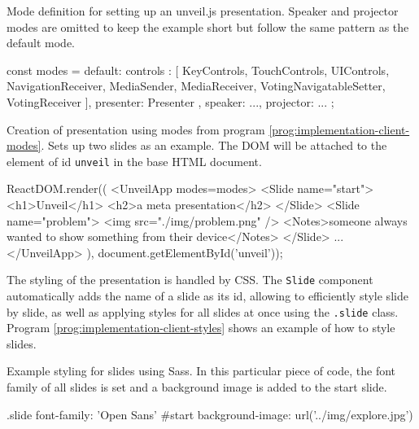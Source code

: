 \begin{program}
\caption{Mode definition for setting up an unveil.js presentation. Speaker and projector modes are omitted to keep the example short but follow the same pattern as the default mode.}
\label{prog:implementation-client-modes}
\begin{JsCode}
const modes = {
  default: {
    controls : [
      KeyControls, TouchControls, UIControls,
      NavigationReceiver,
      MediaSender, MediaReceiver,
      VotingNavigatableSetter, VotingReceiver
    ],
    presenter: Presenter
  },
  speaker: {...},
  projector: {...}
};
\end{JsCode}
\end{program}

\begin{program}
\caption{Creation of presentation using modes from program \ref{prog:implementation-client-modes}. Sets up two slides as an example. The DOM will be attached to the element of id \texttt{unveil} in the base HTML document.}
\label{prog:implementation-client-presentation}
\begin{JsCode}
ReactDOM.render((
  <UnveilApp modes={modes}>
    <Slide name="start">
      <h1>Unveil</h1>
      <h2>a meta presentation</h2>
    </Slide>
    <Slide name="problem">
      <img src="./img/problem.png" />
      <Notes>someone always wanted to show something from their device</Notes>
    </Slide>
    ...
  </UnveilApp>
), document.getElementById('unveil'));
\end{JsCode}
\end{program}

The styling of the presentation is handled by CSS. The \texttt{Slide} component automatically adds the name of a slide as its id, allowing to efficiently style slide by slide, as well as applying styles for all slides at once using the \texttt{.slide} class. Program \ref{prog:implementation-client-styles} shows an example of how to style slides.

\begin{program}
\caption{Example styling for slides using Sass. In this particular piece of code, the font family of all slides is set and a background image is added to the start slide.}
\label{prog:implementation-client-styles}
\begin{CssCode}
  .slide
    font-family: 'Open Sans'
  #start
    background-image: url('../img/explore.jpg')
\end{CssCode}
\end{program}